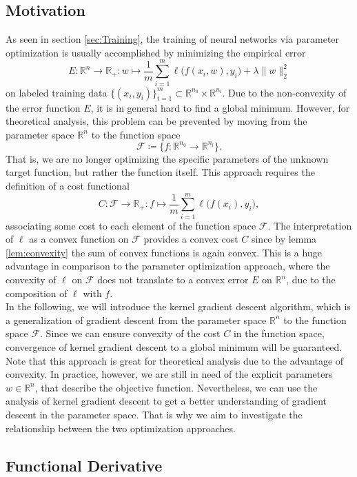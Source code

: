 \documentclass[11pt, a4paper]{article}
\newcommand{\R}{\mathbb{R}}
\newcommand{\F}{\mathcal{F}}
\begin{document}
\subsection{Motivation}

As seen in section \ref{sec:Training}, the training of neural networks via parameter optimization is usually accomplished by minimizing the empirical error
\[ E : \R^n \to \R_+ : w \mapsto \frac{1}{m} \sum_{i=1}^{m} \ell \big ( f(x_i,w),y_i \big) + \lambda \big \| w \big \|_2^2 \]
on labeled training data $\{ (x_i,y_i) \}_{i=1}^m \subset \R^{n_0} \times \R^{n_l}$. Due to the non-convexity of the error function $E$, it is in general hard to find a global minimum. However, for theoretical analysis, this problem can be prevented by moving from the parameter space $\R^n$ to the function space
\[ \F \coloneq \Big \{ f: \R^{n_0} \to \R^{n_l} \Big \}. \]
That is, we are no longer optimizing the specific parameters of the unknown target function, but rather the function itself. This approach requires the definition of a cost functional
\[ C: \F \to \R_+ : f \mapsto \frac{1}{m} \sum_{i=1}^{m} \ell \big ( f(x_i),y_i \big), \]
associating some cost to each element of the function space $\F$. The interpretation of $\ell$ as a convex function on $\F$ provides a convex cost $C$ since by lemma \ref{lem:convexity} the sum of convex functions is again convex. This is a huge advantage in comparison to the parameter optimization approach, where the  convexity of $\ell$ on $\F$ does not translate to a convex error $E$ on $\R^n$, due to the composition of $\ell$ with $f$. \\

In the following, we will introduce the kernel gradient descent algorithm, which is a generalization of gradient descent from the parameter space $\R^n$ to the function space $\F$. Since we can ensure convexity of the cost $C$ in the function space, convergence of kernel gradient descent to a global minimum will be guaranteed. \\

Note that this approach is great for theoretical analysis due to the advantage of convexity. In practice, however, we are still in need of the explicit parameters $w \in \R^n$, that describe the objective function. Nevertheless, we can use the analysis of kernel gradient descent to get a better understanding of gradient descent in the parameter space. That is why we aim to investigate the relationship between the two optimization approaches.


\subsection{Functional Derivative}
\end{document}
